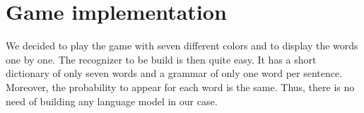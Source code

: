 \section*{Game implementation}
We decided to play the game with seven different colors and to display the words one by one. The recognizer to be build is then quite easy. It has a short dictionary of only seven words and a grammar of only one word per sentence. Moreover, the probability to appear for each word is the same. Thus, there is no need of building any language model in our case.

